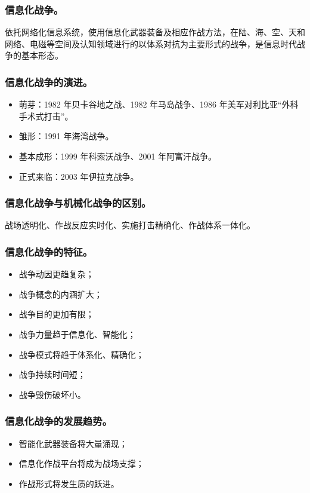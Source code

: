\documentclass{article}
\begin{document}
\subsubsection{信息化战争。}
依托网络化信息系统，使用信息化武器装备及相应作战方法，在陆、海、空、天和网络、电磁等空间及认知领域进行的以体系对抗为主要形式的战争，是信息时代战争的基本形态。

\subsubsection{信息化战争的演进。}
\begin{itemize}
    \item 萌芽：1982 年贝卡谷地之战、1982 年马岛战争、1986 年美军对利比亚“外科手术式打击”。
    \item 雏形：1991 年海湾战争。
    \item 基本成形：1999 年科索沃战争、2001 年阿富汗战争。
    \item 正式来临：2003 年伊拉克战争。
\end{itemize}

\subsubsection{信息化战争与机械化战争的区别。}
战场透明化、作战反应实时化、实施打击精确化、作战体系一体化。

\subsubsection{信息化战争的特征。}
\begin{itemize}
    \item 战争动因更趋复杂；
    \item 战争概念的内涵扩大；
    \item 战争目的更加有限；
    \item 战争力量趋于信息化、智能化；
    \item 战争模式将趋于体系化、精确化；
    \item 战争持续时间短；
    \item 战争毁伤破坏小。
\end{itemize}

\subsubsection{信息化战争的发展趋势。}
\begin{itemize}
    \item 智能化武器装备将大量涌现；
    \item 信息化作战平台将成为战场支撑；
    \item 作战形式将发生质的跃进。
\end{itemize}
\end{document}
